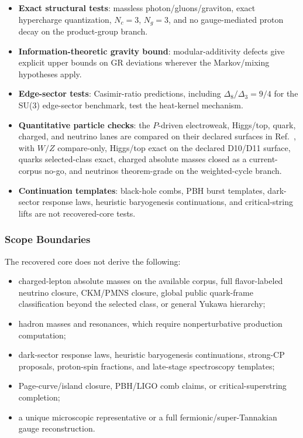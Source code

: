 \begin{itemize}
\tightlist
\item \textbf{Exact structural tests}: massless photon/gluons/graviton, exact hypercharge
quantization, \(N_c=3\), \(N_g=3\), and no gauge-mediated proton decay on the product-group branch.
\item \textbf{Information-theoretic gravity bound}: modular-additivity defects give explicit
upper bounds on GR deviations wherever the Markov/mixing hypotheses apply.
\item \textbf{Edge-sector tests}: Casimir-ratio predictions, including
\(\Delta_8/\Delta_3=9/4\) for the SU(3) edge-sector benchmark, test the heat-kernel mechanism.
\item \textbf{Quantitative particle checks}: the \(P\)-driven electroweak, Higgs/top, quark, charged, and
neutrino lanes are compared on their declared surfaces in Ref.~\cite{ophparticles}, with \(W/Z\) compare-only, Higgs/top exact on the declared D10/D11 surface, quarks selected-class exact, charged absolute masses closed as a current-corpus no-go, and neutrinos theorem-grade on the weighted-cycle branch.
\item \textbf{Continuation templates}: black-hole combs, PBH burst templates, dark-sector
response laws, heuristic baryogenesis continuations, and critical-string lifts are not recovered-core tests.
\end{itemize}

\subsubsection{Scope Boundaries}\label{84-what-is-not-predicted-gaps}

The recovered core does not derive the following:
\begin{itemize}
\item charged-lepton absolute masses on the available corpus, full flavor-labeled neutrino closure, CKM/PMNS closure, global public quark-frame classification beyond the selected class, or general Yukawa hierarchy;
\item hadron masses and resonances, which require nonperturbative production computation;
\item dark-sector response laws, heuristic baryogenesis continuations, strong-CP proposals, proton-spin fractions, and
late-stage spectroscopy templates;
\item Page-curve/island closure, PBH/LIGO comb claims, or critical-superstring completion;
\item a unique microscopic representative or a full fermionic/super-Tannakian gauge reconstruction.
\end{itemize}

